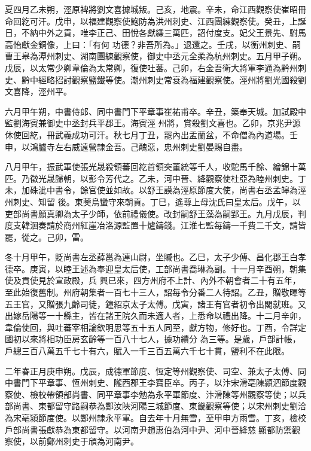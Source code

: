 \begin{pinyinscope}
 夏四月乙未朔，涇原裨將劉文喜據城叛。己亥，地震。辛未，命江西觀察使崔昭冊命回紇可汗。戊申，以福建觀察使鮑防為洪州刺史、江西團練觀察使。癸丑，上誕日，不納中外之貢，唯李正己、田悅各獻縑三萬匹，詔付度支。妃父王景先、駙馬高怡獻金銅像，上曰：「有何
 功德？非吾所為。」退還之。壬戌，以衡州刺史、嗣曹王皋為潭州刺史、湖南團練觀察使，御史中丞元全柔為杭州刺史。五月甲子朔。戊辰，以太常少卿韋倫為太常卿，復使吐蕃。己卯，右金吾衛大將軍李通為黔州刺史、黔中經略招討觀察鹽鐵等使。潮州刺史常袞為福建觀察使。涇州將劉光國殺劉文喜降，涇州平。



 六月甲午朔，中書侍郎、同中書門下平章事崔祐甫卒。辛丑，築奉天城。加試殿中監劉海賓兼御史中丞封兵平郡王。海賓涇
 州將，賞殺劉文喜也。乙卯，京兆尹源休使回紇，冊武義成功可汗。秋七月丁丑，罷內出盂蘭盆，不命僧為內道場。壬申，以鴻臚寺左右威遠營隸金吾。己醜惡，忠州刺史劉晏賜自盡。



 八月甲午，振武軍使張光晟殺領蕃回紇首領突董統等千人，收駝馬千餘、繒錦十萬匹。乃徵光晟歸朝，以彭令芳代之。乙未，河中晉、絳觀察使杜亞為睦州刺史。丁未，加硃泚中書令，餘官使並如故。以舒王謨為涇原節度大使，尚書右丞孟皞為涇州刺史、知留
 後。東僰烏蠻守來朝貢。丁巳，遙尊上母沈氏曰皇太后。戊午，以吏部尚書顏真卿為太子少師，依前禮儀使。改封嗣舒王藻為嗣郢王。九月戊辰，判度支韓洄奏請於商州紅崖冶洛源監置十爐鑄錢。江淮七監每鑄一千費二千文，請皆罷，從之。己卯，雷。



 冬十月甲午，貶尚書左丞薛邕為連山尉，坐贓也。乙巳，太子少傅、昌化郡王白孝德卒。庚寅，以睦王述為奉迎皇太后使，工部尚書喬琳為副。十一月辛酉朔，朝集使及貢使見於宣政殿，兵
 興已來，四方州府不上計、內外不朝會者二十有五年，至此始復舊制。州府朝集者一百七十三人，詔每令分番二人待詔。乙丑，贈敬暉等五王官，又贈張九齡司徒，鐘紹京太子太傅。戊寅，諸王有官者初令出閣就班。又出嫁岳陽等一十縣主，皆在諸王院久而未適人者，上悉命以禮出降。十二月辛卯，韋倫使回，與吐蕃宰相論欽明思等五十五人同至，獻方物，修好也。丁酉，令詳定國初以來將相功臣房玄齡等一百八十七人，據功績分
 為三等。是歲，戶部計帳，戶總三百八萬五千七十有六，賦入一千三百五萬六千七十貫，鹽利不在此限。



 二年春正月庚申朔。戊辰，成德軍節度、恆定等州觀察使、司空、兼太子太傅、同中書門下平章事、恆州刺史、隴西郡王李寶臣卒。丙子，以汴宋滑亳陳潁泗節度觀察使、檢校帶領部尚書、同平章事李勉為永平軍節度、汴滑陳等州觀察等使；以兵部尚書、東都留守路嗣恭為鄭汝陜河陽三城節度、東畿觀察等使；以宋州刺史劉洽
 為宋亳潁節度使。以鄭州隸永平軍。自去年十月無雪，至甲申方雨雪。丁亥，檢校戶部尚書張獻恭為東都留守。以河南尹趙惠伯為河中尹、河中晉絳慈顯都防禦觀察使，以前鄭州刺史于頎為河南尹。




\end{pinyinscope}
